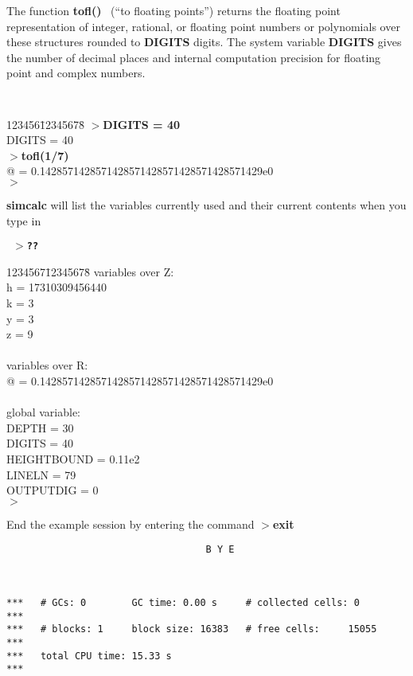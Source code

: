 The function {\bf tofl() }\ (``to floating points'') returns the floating point representation of integer, rational, or floating point numbers or polynomials
over these structures rounded to {\bf DIGITS} digits. The system variable 
{\bf DIGITS} gives the number of decimal places and internal computation 
precision for floating point and complex numbers.
\leer
{\tt
  \begin{tabbing}
  123456\=12345678\=\kill
  $>${\bf DIGITS = 40}\ \ \care \\
  \> DIGITS = 40\\
  $>${\bf tofl(1/7)}\ \  \care\\
  \>\> @ = 0.1428571428571428571428571428571428571429e0\\
  $>$
  \end{tabbing}
}
\leer

{\bf simcalc} will list the variables currently used and their current
contents when you type in
\leer
{\tt
  $>${\bf ??}\ \ \care

  \begin{tabbing}
  1234567\=12345678\=\kill
  variables over Z:\\
  \> h = 17310309456440\\
  \> k = 3\\
  \> y = 3\\
  \> z = 9\\
  \> \\
  variables over R:\\
  \> @ = 0.1428571428571428571428571428571428571429e0\\
  \> \\
  global variable:\\
  \> DEPTH = 30\\
  \> DIGITS = 40\\
  \> HEIGHTBOUND = 0.11e2\\
  \> LINELN = 79\\
  \> OUTPUTDIG = 0\\
  $>$
  \end{tabbing}
}

End the example session by entering the command
\leer
$>${\bf exit}\ \ \care

\begin{verbatim}
                                   B Y E



***   # GCs: 0        GC time: 0.00 s     # collected cells: 0      ***
***   # blocks: 1     block size: 16383   # free cells:     15055   ***
***   total CPU time: 15.33 s                                       ***
\end{verbatim}

